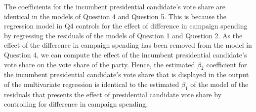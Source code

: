\documentclass[12pt,letterpaper]{article}
\begin{document}
\begin{enumerate}
		The coefficients for the incumbent presidential candidate's vote share are identical in the models of Question 4 and Question 5. This is because the regression model in Q4 controls for the effect of difference in campaign spending by regressing the residuals of the models of Question 1 and Question 2. As the effect of the difference in campaign spending has been removed from the model in Question 4, we can compute the effect of the incumbent presidential candidate's vote share on the vote share of the party. Hence, the estimated $\beta_2$ coefficient for the incumbent presidential candidate's vote share that is displayed in the output of the multivariate regression is identical to the estimated $\beta_1$ of the model of the residuals that presents the effect of presidential candidate vote share by controlling for difference in campaign spending.
		
	\end{enumerate}
\end{document}
